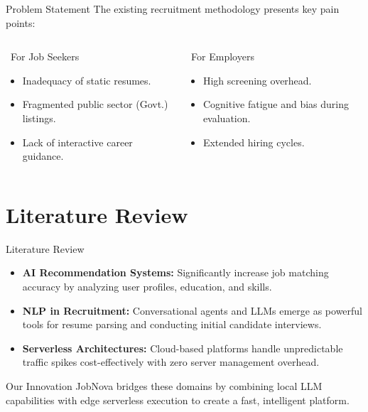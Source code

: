 \documentclass[aspectratio=169]{beamer}
\begin{document}
\begin{frame}{Problem Statement}
    The existing recruitment methodology presents key pain points:
    
    \vspace{0.5cm}
    \begin{columns}[T,onlytextwidth]
            \begin{block}{\faUserTie\ For Job Seekers}
                \begin{itemize}
                    \item Inadequacy of static resumes.
                    \item Fragmented public sector (Govt.) listings.
                    \item Lack of interactive career guidance.
                \end{itemize}
            \end{block}

            \begin{block}{\faBuilding\ For Employers}
                \begin{itemize}
                    \item High screening overhead.
                    \item Cognitive fatigue and bias during evaluation.
                    \item Extended hiring cycles.
                \end{itemize}
            \end{block}
    \end{columns}
\end{frame}

\section{Literature Review}

\begin{frame}{Literature Review}
    \begin{itemize}
        \item \textbf{AI Recommendation Systems:} Significantly increase job matching accuracy by analyzing user profiles, education, and skills.
        \vspace{0.2cm}
        \item \textbf{NLP in Recruitment:} Conversational agents and LLMs emerge as powerful tools for resume parsing and conducting initial candidate interviews.
        \vspace{0.2cm}
        \item \textbf{Serverless Architectures:} Cloud-based platforms handle unpredictable traffic spikes cost-effectively with zero server management overhead.
    \end{itemize}
    \vspace{0.3cm}
    \begin{alertblock}{Our Innovation}
        JobNova bridges these domains by combining local LLM capabilities with edge serverless execution to create a fast, intelligent platform.
    \end{alertblock}
\end{frame}
\end{document}
